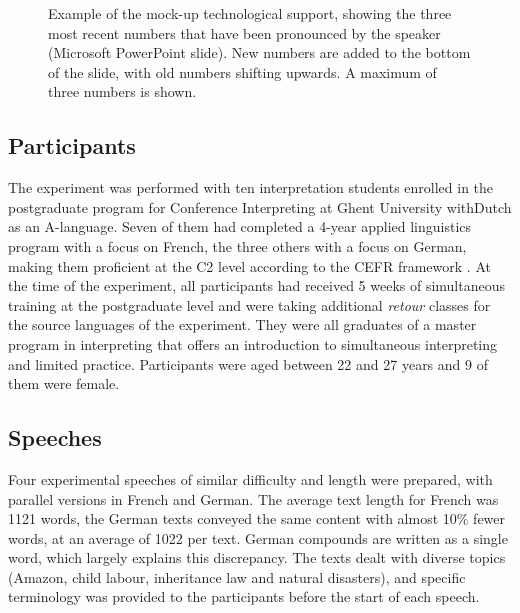 \documentclass[output=paper]{langsci/langscibook}
\begin{document}
\begin{figure}
\caption{Example of the mock-up technological support, showing the three most recent numbers that have been pronounced by the speaker (Microsoft PowerPoint slide). New numbers are added to the bottom of the slide, with old numbers shifting upwards. A maximum of three numbers is shown.\label{fig:01:1}}
\end{figure}

\subsection{Participants}

The experiment was performed with ten interpretation students enrolled in the postgraduate program for Conference Interpreting at Ghent University with\linebreak Dutch as an A-language. Seven of them had completed a 4-year applied linguistics program with a focus on French, the three others with a focus on German, making them proficient at the C2 level according to the \textsc{CEFR} framework \citep{Council2001}. At the time of the experiment, all participants had received 5 weeks of simultaneous training at the postgraduate level and were taking additional \textit{retour} classes for the source languages of the experiment. They were all graduates of a master program in interpreting that offers an introduction to simultaneous interpreting and limited practice. Participants were aged between 22 and 27 years and 9 of them were female. 

\subsection{Speeches}

Four experimental speeches of similar difficulty and length were prepared, with parallel versions in French and German. The average text length for French was 1121 words, the German texts conveyed the same content with almost 10\% fewer words, at an average of 1022 per text. German compounds are written as a single word, which largely explains this discrepancy. The texts dealt with diverse topics (Amazon, child labour, inheritance law and natural disasters), and specific terminology was provided to the participants before the start of each speech.
\end{document}
